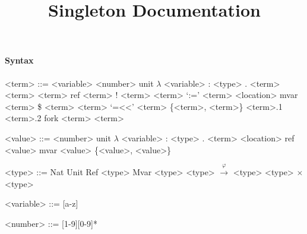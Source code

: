 \documentclass[10pt]{article}
\title{Singleton Documentation}
\newcommand{\xto}{\xrightarrow}
\theoremstyle{definition}\newtheorem*{theorem}{Theorem}
\theoremstyle{definition}\newtheorem*{definition}{Definition}
\begin{document}
	\maketitle
    \paragraph{Syntax}
    \setlength{\grammarindent}{8em} %
    \begin{grammar}
        <term> ::= <variable> 
        \vspace{0.8em}
        \alt <number>
        \vspace{0.8em}
        \alt unit
        \vspace{0.8em}
        \alt $\lambda$ <variable> : <type> . <term>
        \vspace{0.8em}
        \alt <term> <term>
        \vspace{0.8em}
        \alt ref <term> 
        \vspace{0.8em}
        \alt ! <term>
        \vspace{0.8em}
        \alt <term> `:=' <term>
        \vspace{0.8em}
        \alt <location>
        \vspace{0.8em}
        \alt mvar <term> 
        \vspace{0.8em}
        \alt \$ <term>
        \vspace{0.8em}
        \alt <term> `=<<' <term>
        \vspace{0.8em}
        \alt \{\;<term>, <term>\;\}
        \vspace{0.8em}
        \alt <term>.1
        \vspace{0.8em}
        \alt <term>.2
        \vspace{0.8em}
        \alt fork <term> <term>

        <value> ::= <number>
        \vspace{0.8em}
        \alt unit
        \vspace{0.8em}
        \alt $\lambda$ <variable> : <type> . <term>
        \vspace{0.8em}
        \alt <location>
        \vspace{0.8em}
        \alt ref <value>
        \vspace{0.8em}
        \alt mvar <value>
        \vspace{0.8em}
        \alt \{\;<value>, <value>\;\}

        <type> ::= Nat
        \vspace{0.8em}
        \alt Unit
        \vspace{0.8em}
        \alt Ref <type>
        \vspace{0.8em}
        \alt Mvar <type>
        \vspace{0.8em}
        \alt <type> $\xto{\varphi}$ <type>
        \vspace{0.8em}
        \alt <type> $\times$ <type>

        <variable> ::= [a-z]

        <number> ::= [1-9][0-9]*
    \end{grammar}
\end{document}
